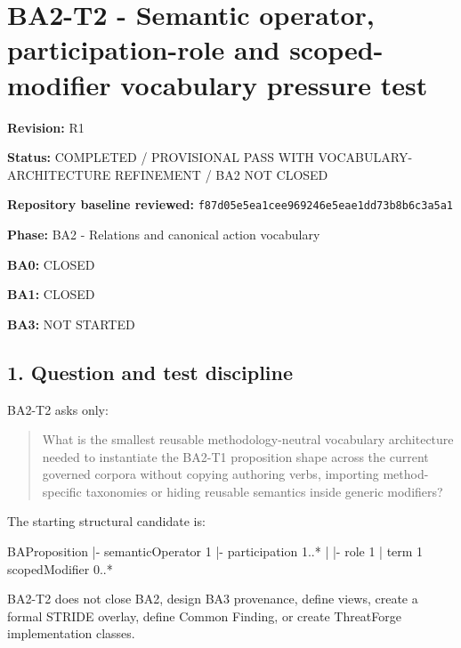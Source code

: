 \documentclass[
  10pt,
  letterpaper,
]{article}
\author{}
\date{}
\newenvironment{Shaded}{}{}
\newcommand{\NormalTok}[1]{#1}
\begin{document}
\section{BA2-T2 - Semantic operator, participation-role and
scoped-modifier vocabulary pressure
test}\label{ba2-t2---semantic-operator-participation-role-and-scoped-modifier-vocabulary-pressure-test}

\textbf{Revision:} R1

\textbf{Status:} COMPLETED / PROVISIONAL PASS WITH
VOCABULARY-ARCHITECTURE REFINEMENT / BA2 NOT CLOSED

\textbf{Repository baseline reviewed:}
\texttt{f87d05e5ea1cee969246e5eae1dd73b8b6c3a5a1}

\textbf{Phase:} BA2 - Relations and canonical action vocabulary

\textbf{BA0:} CLOSED

\textbf{BA1:} CLOSED

\textbf{BA3:} NOT STARTED

\subsection{1. Question and test
discipline}\label{question-and-test-discipline}

BA2-T2 asks only:

\begin{quote}
What is the smallest reusable methodology-neutral vocabulary
architecture needed to instantiate the BA2-T1 proposition shape across
the current governed corpora without copying authoring verbs, importing
method-specific taxonomies or hiding reusable semantics inside generic
modifiers?
\end{quote}

The starting structural candidate is:

\begin{Shaded}
\begin{Highlighting}[]
\NormalTok{BAProposition}
\NormalTok{|{-} semanticOperator   1}
\NormalTok{|{-} participation      1..*}
\NormalTok{|    |{-} role          1}
\NormalTok{|    \textasciigrave{}{-} term          1}
\NormalTok{\textasciigrave{}{-} scopedModifier     0..*}
\end{Highlighting}
\end{Shaded}

BA2-T2 does not close BA2, design BA3 provenance, define views, create a
formal STRIDE overlay, define Common Finding, or create ThreatForge
implementation classes.
\end{document}
